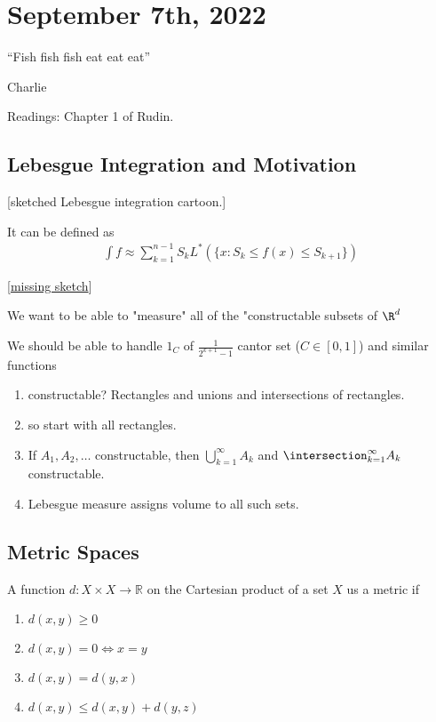 \section{September 7th, 2022}

\epigraph{``Fish fish fish eat eat eat''}{Charlie}

Readings: Chapter 1 of Rudin.

\subsection{Lebesgue Integration and Motivation}

[sketched Lebesgue integration cartoon.]

It can be defined as 
\begin{align*}
	\int f \approx \sum_{k=1}^{n-1} S_k L^* (\{x : S_k \leq f(x) \leq S_{k+1}\})
\end{align*} 

[\underline{missing sketch}]

We want to be able to "measure" all of the "constructable subsets of $\R^d$

We should be able to handle $1_C$ of $\frac{1}{2^{k+1} -1 }$ cantor set ($C \in [0,1]$) and similar functions

\begin{enumerate}
	\item constructable? Rectangles and unions and intersections of rectangles.
	\item so start with all rectangles.
	\item If $A_1, A_2, \ldots$ constructable, then
		$\bigcup_{k=1}^{\infty}A_k$ and $\intersection_{k=1}^{\infty}A_k$ constructable.
	\item Lebesgue measure assigns volume to all such sets.
\end{enumerate}
 
\subsection{Metric Spaces}

A function $d : X \times X \to \mathbb{R}$ on the Cartesian product of a set $X$ us a metric if

\begin{enumerate}
	\item $d(x,y) \geq 0$
	\item $d(x,y) = 0 \iff x = y$
	\item $d(x,y) = d(y,x)$
	\item $d(x,y) \leq d(x,y) + d(y,z)$
\end{enumerate}

